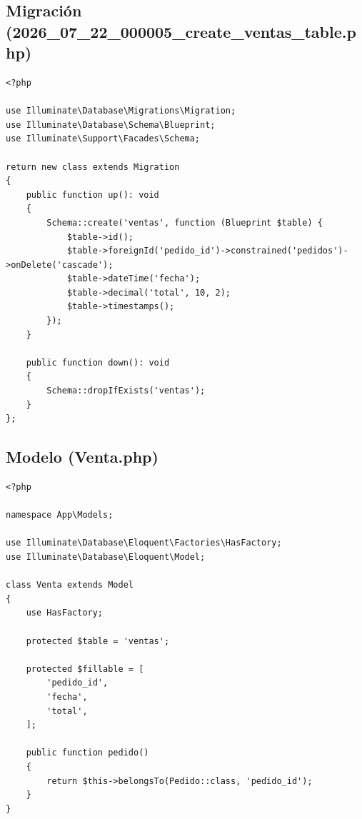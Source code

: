 \documentclass[12pt, letterpaper]{article}
\begin{document}
\subsection{Migración (2026\_07\_22\_000005\_create\_ventas\_table.php)}
\begin{lstlisting}[language=purePHP]
<?php

use Illuminate\Database\Migrations\Migration;
use Illuminate\Database\Schema\Blueprint;
use Illuminate\Support\Facades\Schema;

return new class extends Migration
{
    public function up(): void
    {
        Schema::create('ventas', function (Blueprint $table) {
            $table->id();
            $table->foreignId('pedido_id')->constrained('pedidos')->onDelete('cascade');
            $table->dateTime('fecha');
            $table->decimal('total', 10, 2);
            $table->timestamps();
        });
    }

    public function down(): void
    {
        Schema::dropIfExists('ventas');
    }
};
\end{lstlisting}

\subsection{Modelo (Venta.php)}
\begin{lstlisting}[language=purePHP]
<?php

namespace App\Models;

use Illuminate\Database\Eloquent\Factories\HasFactory;
use Illuminate\Database\Eloquent\Model;

class Venta extends Model
{
    use HasFactory;

    protected $table = 'ventas';

    protected $fillable = [
        'pedido_id',
        'fecha',
        'total',
    ];

    public function pedido()
    {
        return $this->belongsTo(Pedido::class, 'pedido_id');
    }
}
\end{lstlisting}
\end{document}
